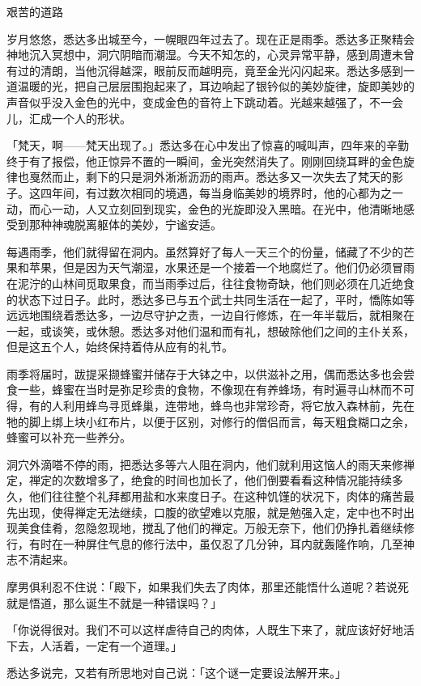\documentclass[12pt,twoside,openany]{book}
\begin{document}
艰苦的道路

岁月悠悠，悉达多出城至今，一幌眼四年过去了。现在正是雨季。悉达多正聚精会神地沉入冥想中，洞穴阴暗而潮湿。今天不知怎的，心灵异常平静，感到周遭未曾有过的清朗，当他沉得越深，眼前反而越明亮，竟至金光闪闪起来。悉达多感到一道温暖的光，把自己层层围抱起来了，耳边响起了银钤似的美妙旋律，旋即美妙的声音似乎没入金色的光中，变成金色的音符上下跳动着。光越来越强了，不一会儿，汇成一个人的形状。

「梵天，啊——梵天出现了。」悉达多在心中发出了惊喜的喊叫声，四年来的辛勤终于有了报偿，他正惊异不置的一瞬间，金光突然消失了。刚刚回绕耳畔的金色旋律也戛然而止，剩下的只是洞外淅淅沥沥的雨声。悉达多又一次失去了梵天的影子。这四年间，有过数次相同的境遇，每当身临美妙的境界时，他的心都为之一动，而心一动，人又立刻回到现实，金色的光旋即没入黑暗。在光中，他清晰地感受到那种神魂脱离躯体的美妙，宁谧安适。

每遇雨季，他们就得留在洞内。虽然算好了每人一天三个的份量，储藏了不少的芒果和苹果，但是因为天气潮湿，水果还是一个接着一个地腐烂了。他们仍必须冒雨在泥泞的山林间觅取果食，而当雨季过后，往往食物奇缺，他们则必须在几近绝食的状态下过日子。此时，悉达多已与五个武士共同生活在一起了，平时，憍陈如等远远地围绕着悉达多，一边尽守护之责，一边自行修炼，在一年半载后，就相聚在一起，或谈笑，或休憩。悉达多对他们温和而有礼，想破除他们之间的主仆关系，但是这五个人，始终保持着侍从应有的礼节。

雨季将届时，跋提采撷蜂蜜并储存于大钵之中，以供滋补之用，偶而悉达多也会尝食一些，蜂蜜在当时是弥足珍贵的食物，不像现在有养蜂场，有时遍寻山林而不可得，有的人利用蜂鸟寻觅蜂巢，连带地，蜂鸟也非常珍奇，将它放入森林前，先在牠的脚上绑上块小红布片，以便于区别，对修行的僧侣而言，每天粗食糊口之余，蜂蜜可以补充一些养分。

洞穴外滴嗒不停的雨，把悉达多等六人阻在洞内，他们就利用这恼人的雨天来修禅定，禅定的次数增多了，绝食的时间也加长了，他们倒要看看这种情况能持续多久，他们往往整个礼拜都用盐和水来度日子。在这种饥馑的状况下，肉体的痛苦最先出现，使得禅定无法继续，口腹的欲望难以克服，就是勉强入定，定中也不时出现美食佳肴，忽隐忽现地，搅乱了他们的禅定。万般无奈下，他们仍挣扎着继续修行，有时在一种屏住气息的修行法中，虽仅忍了几分钟，耳内就轰隆作响，几至神志不清起来。

摩男俱利忍不住说：「殿下，如果我们失去了肉体，那里还能悟什么道呢？若说死就是悟道，那么诞生不就是一种错误吗？」

「你说得很对。我们不可以这样虐待自己的肉体，人既生下来了，就应该好好地活下去，人活着，一定有一个道理。」

悉达多说完，又若有所思地对自己说：「这个谜一定要设法解开来。」
\end{document}

